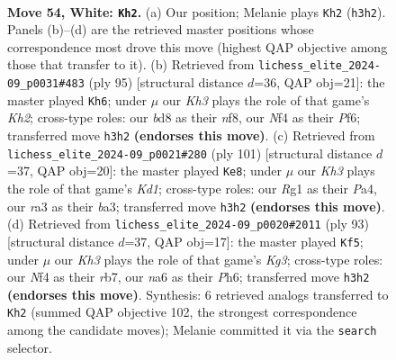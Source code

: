 \documentclass[11pt]{article}
\begin{document}
\clearpage

\begin{figure}[p]\centering
\begin{subfigure}{0.46\textwidth}\centering
\resizebox{\linewidth}{!}{%
\newchessgame
\chessboard[
  setfen={2kb4/1p5p/n5pP/p4p2/5N2/r5PK/3R4/6R1 w - - 4 54},
  showmover=false,
  pgfstyle=straightmove, color=movearrow, markmove={h3-h2}
]}
\caption{}
\end{subfigure}\hfill
\begin{subfigure}{0.46\textwidth}\centering
\resizebox{\linewidth}{!}{%
\newchessgame
\chessboard[
  setfen={5Nr1/2R3pk/5p2/5P2/1B4PK/P6P/4r3/8 b - - 4 48},
  showmover=false,
  pgfstyle=straightmove, color=movearrow, markmove={h7-h6}
]}
\caption{}
\end{subfigure}
\\[4pt]
\begin{subfigure}{0.46\textwidth}\centering
\resizebox{\linewidth}{!}{%
\newchessgame
\chessboard[
  setfen={3k1b1R/1p2p3/2n5/4P3/p3KP2/B1P2N2/1P6/3r4 b - - 2 51},
  showmover=false,
  pgfstyle=straightmove, color=movearrow, markmove={d8-e8}
]}
\caption{}
\end{subfigure}\hfill
\begin{subfigure}{0.46\textwidth}\centering
\resizebox{\linewidth}{!}{%
\newchessgame
\chessboard[
  setfen={8/1R4p1/6kp/1n1PP3/p4P2/6KP/Pr3B2/8 b - - 1 47},
  showmover=false,
  pgfstyle=straightmove, color=movearrow, markmove={g6-f5}
]}
\caption{}
\end{subfigure}
\caption{\textbf{Move 54, White: \texttt{Kh2}.} (a) Our position; Melanie plays \texttt{Kh2} (\texttt{h3h2}). Panels (b)--(d) are the retrieved master positions whose correspondence most drove this move (highest QAP objective among those that transfer to it). (b) Retrieved from \texttt{lichess\_elite\_2024-09\_p0031\#483} (ply 95) [structural distance $d$=36, QAP obj=21]: the master played \texttt{Kh6}; under $\mu$ our \emph{Kh3} plays the role of that game's \emph{Kh2}; cross-type roles: our \emph{b}d8 as their \emph{n}f8, our \emph{N}f4 as their \emph{P}f6; transferred move \texttt{h3h2} \textbf{(endorses this move)}. (c) Retrieved from \texttt{lichess\_elite\_2024-09\_p0021\#280} (ply 101) [structural distance $d$=37, QAP obj=20]: the master played \texttt{Ke8}; under $\mu$ our \emph{Kh3} plays the role of that game's \emph{Kd1}; cross-type roles: our \emph{R}g1 as their \emph{P}a4, our \emph{r}a3 as their \emph{b}a3; transferred move \texttt{h3h2} \textbf{(endorses this move)}. (d) Retrieved from \texttt{lichess\_elite\_2024-09\_p0020\#2011} (ply 93) [structural distance $d$=37, QAP obj=17]: the master played \texttt{Kf5}; under $\mu$ our \emph{Kh3} plays the role of that game's \emph{Kg3}; cross-type roles: our \emph{N}f4 as their \emph{r}b7, our \emph{n}a6 as their \emph{P}h6; transferred move \texttt{h3h2} \textbf{(endorses this move)}. Synthesis: 6 retrieved analogs transferred to \texttt{Kh2} (summed QAP objective 102, the strongest correspondence among the candidate moves); Melanie committed it via the \texttt{search} selector.}
\label{fig:thought-m106}
\end{figure}
\end{document}
